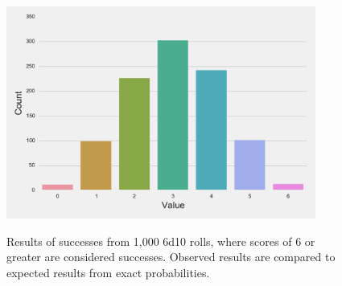 \documentclass{article}
\begin{document}
\begin{figure}[H]
\begin{floatrow}
\includegraphics[width=4in]{6d10_min6.pdf}
{%
}
\end{floatrow}
\caption{Results of successes from 1,000 6d10 rolls, where scores of 6 or greater are considered successes. Observed results are compared to expected results from exact probabilities.}
\end{figure}

\end{document}
